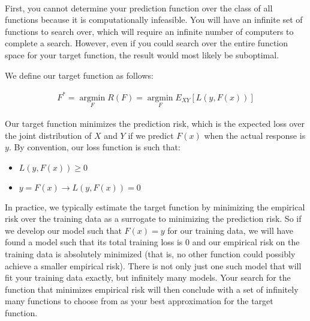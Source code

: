 \documentclass[11pt]{article}
\DeclareMathOperator*{\argmin}{argmin}
\newcommand*{\argminl}{\argmin\limits}
\begin{document}
\begin{center}

\ \\
\end{center}


\vspace{5 mm}
\noindent
First, you cannot determine your prediction function over the class of all functions because it is computationally infeasible. You will have an infinite set of functions to search over, which will require an infinite number of computers to complete a search. However, even if you could search over the entire function space for your target function, the result would most likely be suboptimal.

\vspace{5 mm}
\noindent
We define our target function as follows:

\begin{gather*}
F^{*} = \argminl_{F} R(F) = \argminl_{F} E_{XY}[L(y, F(x))]
\end{gather*}

\vspace{5 mm}
\noindent
Our target function minimizes the prediction risk, which is the expected loss over the joint distribution of $X$ and $Y$ if we predict $F(x)$ when the actual response is $y$. By convention, our loss function is such that:

\begin{itemize}
\item $L(y, F(x)) \ge 0$
\item $y = F(x) \rightarrow L(y, F(x)) = 0$
\end{itemize}

\noindent
In practice, we typically estimate the target function by minimizing the empirical risk over the training data as a surrogate to minimizing the prediction risk. So if we develop our model such that $F(x) = y$ for our training data, we will have found a model such that its total training loss is $0$ and our empirical risk on the training data is absolutely minimized (that is, no other function could possibly achieve a smaller empirical risk). There is not only just one such model that will fit your training data exactly, but infinitely many models. Your search for the function that minimizes empirical risk will then conclude with a set of infinitely many functions to choose from as your best approximation for the target function. 
\end{document}
